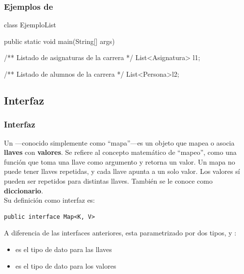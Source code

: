 \documentclass{beamer}
\begin{document}
\begin{frame}[fragile]
  \frametitle{Ejemplos de }

  \begin{jsmall}
    class EjemploList {
      public static void main(String[] args) {
        /** Listado de asignaturas de la carrera */
        List<Asignatura> l1;

        /** Listado de alumnos de la carrera */
        List<Persona>l2;
      }
    }    
  \end{jsmall}
  
\end{frame}


\subsection{Interfaz }

\begin{frame}[fragile]
  \frametitle{Interfaz }

  Un ---conocido simplemente como ``mapa''---es un objeto
  que mapea o asocia \textbf{llaves} con \textbf{valores}. Se refiere
  al concepto matemático de ``mapeo'', como una función que toma una
  llave como argumento y retorna un valor. Un mapa no puede tener
  llaves repetidas, y cada llave apunta a un solo valor. Los valores
  sí pueden ser repetidos para distintas llaves. También se le conoce
  como \textbf{diccionario}.\\

  Su definición como interfaz es:
  
\begin{verbatim}
public interface Map<K, V>
\end{verbatim}

  A diferencia de las interfaces anteriores,  esta
  parametrizado por dos tipos,  y :

  \begin{itemize}
    \setlength\itemsep{0.1em}
  \item {} es el tipo de dato para las llaves    
  \item {} es el tipo de dato para los valores
  \end{itemize}
  
\end{frame}
\end{document}
